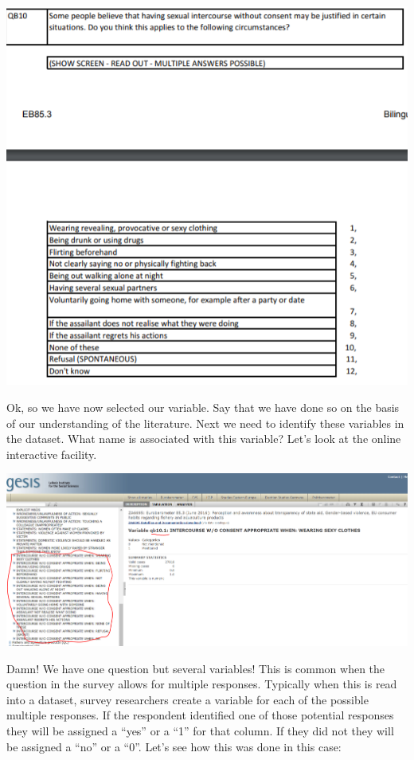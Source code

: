 \documentclass[]{book}
\theoremstyle{definition}
\theoremstyle{definition}
\theoremstyle{definition}
\theoremstyle{remark}
\begin{document}
\includegraphics{imgs/qb10.PNG}

Ok, so we have now selected our variable. Say that we have done so on
the basis of our understanding of the literature. Next we need to
identify these variables in the dataset. What name is associated with
this variable? Let's look at the online interactive facility.

\includegraphics{imgs/qb10codes.PNG}

Damn! We have one question but several variables! This is common when
the question in the survey allows for multiple responses. Typically when
this is read into a dataset, survey researchers create a variable for
each of the possible multiple responses. If the respondent identified
one of those potential responses they will be assigned a ``yes'' or a
``1'' for that column. If they did not they will be assigned a ``no'' or
a ``0''. Let's see how this was done in this case:
\end{document}
